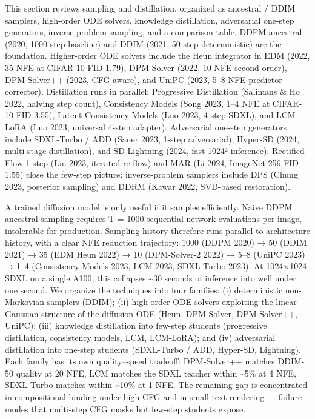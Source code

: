 \documentclass{article}
\begin{document}
This section reviews sampling and distillation, organized as ancestral / DDIM samplers, high-order ODE solvers, knowledge distillation, adversarial one-step generators, inverse-problem sampling, and a comparison table. DDPM ancestral (2020, 1000-step baseline) and DDIM (2021, 50-step deterministic) are the foundation. Higher-order ODE solvers include the Heun integrator in EDM (2022, 35 NFE at CIFAR-10 FID 1.79), DPM-Solver (2022, 10-NFE second-order), DPM-Solver++ (2023, CFG-aware), and UniPC (2023, 5--8-NFE predictor-corrector). Distillation runs in parallel: Progressive Distillation (Salimans \& Ho 2022, halving step count), Consistency Models (Song 2023, 1--4 NFE at CIFAR-10 FID 3.55), Latent Consistency Models (Luo 2023, 4-step SDXL), and LCM-LoRA (Luo 2023, universal 4-step adapter). Adversarial one-step generators include SDXL-Turbo / ADD (Sauer 2023, 1-step adversarial), Hyper-SD (2024, multi-stage distillation), and SD-Lightning (2024, fast 1024² inference). Rectified Flow 1-step (Liu 2023, iterated re-flow) and MAR (Li 2024, ImageNet 256 FID 1.55) close the few-step picture; inverse-problem samplers include DPS (Chung 2023, posterior sampling) and DDRM (Kawar 2022, SVD-based restoration).

A trained diffusion model is only useful if it samples efficiently. Naive DDPM ancestral sampling requires T = 1000 sequential network evaluations per image, intolerable for production. Sampling history therefore runs parallel to architecture history, with a clear NFE reduction trajectory: 1000 (DDPM 2020) → 50 (DDIM 2021) → 35 (EDM Heun 2022) → 10 (DPM-Solver-2 2022) → 5--8 (UniPC 2023) → 1--4 (Consistency Models 2023, LCM 2023, SDXL-Turbo 2023). At 1024×1024 SDXL on a single A100, this collapses \textasciitilde30 seconds of inference into well under one second. We organize the techniques into four families: (i) deterministic non-Markovian samplers (DDIM); (ii) high-order ODE solvers exploiting the linear-Gaussian structure of the diffusion ODE (Heun, DPM-Solver, DPM-Solver++, UniPC); (iii) knowledge distillation into few-step students (progressive distillation, consistency models, LCM, LCM-LoRA); and (iv) adversarial distillation into one-step students (SDXL-Turbo / ADD, Hyper-SD, Lightning). Each family has its own quality--speed tradeoff: DPM-Solver++ matches DDIM-50 quality at 20 NFE, LCM matches the SDXL teacher within \textasciitilde5\% at 4 NFE, SDXL-Turbo matches within \textasciitilde10\% at 1 NFE. The remaining gap is concentrated in compositional binding under high CFG and in small-text rendering --- failure modes that multi-step CFG masks but few-step students expose.
\end{document}
